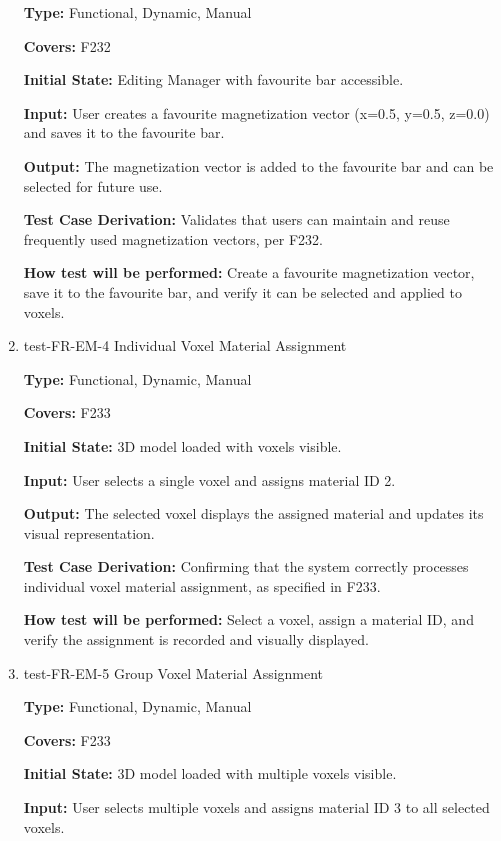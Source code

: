 \documentclass[12pt, titlepage]{article}
\begin{document}
\begin{enumerate}
\textbf{Type:} Functional, Dynamic, Manual

\textbf{Covers:} F232
					
\textbf{Initial State:} Editing Manager with favourite bar accessible.
					
\textbf{Input:} User creates a favourite magnetization vector (x=0.5, y=0.5, z=0.0) and saves it to the favourite bar.
					
\textbf{Output:} The magnetization vector is added to the favourite bar and can be selected for future use.

\textbf{Test Case Derivation:} Validates that users can maintain and reuse frequently used magnetization vectors, per F232.
					
\textbf{How test will be performed:} Create a favourite magnetization vector, save it to the favourite bar, and verify it can be selected and applied to voxels.

\item{test-FR-EM-4 Individual Voxel Material Assignment\\}

\textbf{Type:} Functional, Dynamic, Manual

\textbf{Covers:} F233
					
\textbf{Initial State:} 3D model loaded with voxels visible.
					
\textbf{Input:} User selects a single voxel and assigns material ID 2.
					
\textbf{Output:} The selected voxel displays the assigned material and updates its visual representation.

\textbf{Test Case Derivation:} Confirming that the system correctly processes individual voxel material assignment, as specified in F233.
					
\textbf{How test will be performed:} Select a voxel, assign a material ID, and verify the assignment is recorded and visually displayed.

\item{test-FR-EM-5 Group Voxel Material Assignment\\}

\textbf{Type:} Functional, Dynamic, Manual

\textbf{Covers:} F233
					
\textbf{Initial State:} 3D model loaded with multiple voxels visible.
					
\textbf{Input:} User selects multiple voxels and assigns material ID 3 to all selected voxels.
					

\end{enumerate}
\end{document}
